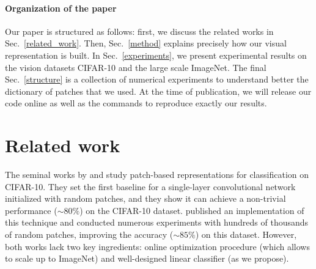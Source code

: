 \documentclass{article} %
\begin{document}
\paragraph{Organization of the paper}Our paper is structured as follows: first, we discuss the related works in Sec.~\ref{related_work}. Then, Sec.~\ref{method} explains precisely how our visual representation is built. In Sec.~\ref{experiments}, we present experimental results on the vision datasets CIFAR-10 and the large scale  ImageNet. The final Sec.~\ref{structure} is a collection of numerical experiments to understand better the dictionary of patches that we used. At the time of publication, we will release our code online as well as the commands to reproduce exactly our results.




\section{Related work}

The seminal works by \cite{coates2011analysis} and \cite{coates2011importance}  study patch-based representations for classification on CIFAR-10.
They set the first baseline for a single-layer convolutional network initialized with random patches, and they show it can achieve a non-trivial performance ($\sim 80 \%$) on the CIFAR-10 dataset. 
 \cite{recht2019imagenet} published an implementation of this technique and conducted numerous experiments with hundreds of thousands of random patches, improving the accuracy ($\sim 85 \%$) on this dataset.
However, both works lack two key ingredients: online optimization procedure  (which allows to scale up to ImageNet) and well-designed linear classifier (as we propose).
\end{document}

